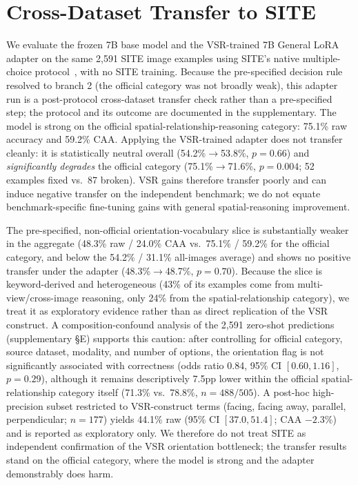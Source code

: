 \section{Cross-Dataset Transfer to SITE}
\label{sec:site}
We evaluate the frozen 7B base model and the VSR-trained 7B General LoRA adapter on the same 2,591 SITE image examples using SITE's native multiple-choice protocol~\cite{wang2025site}, with no SITE training. Because the pre-specified decision rule resolved to branch 2 (the official category was not broadly weak), this adapter run is a post-protocol cross-dataset transfer check rather than a pre-specified step; the protocol and its outcome are documented in the supplementary. The model is strong on the official spatial-relationship-reasoning category: 75.1\% raw accuracy and 59.2\% CAA. Applying the VSR-trained adapter does not transfer cleanly: it is statistically neutral overall (54.2\%$\rightarrow$53.8\%, $p=0.66$) and \emph{significantly degrades} the official category (75.1\%$\rightarrow$71.6\%, $p=0.004$; 52 examples fixed vs.\ 87 broken). VSR gains therefore transfer poorly and can induce negative transfer on the independent benchmark; we do not equate benchmark-specific fine-tuning gains with general spatial-reasoning improvement.

The pre-specified, non-official orientation-vocabulary slice is substantially weaker in the aggregate (48.3\% raw / 24.0\% CAA vs.\ 75.1\% / 59.2\% for the official category, and below the 54.2\% / 31.1\% all-images average) and shows no positive transfer under the adapter (48.3\%$\rightarrow$48.7\%, $p=0.70$). Because the slice is keyword-derived and heterogeneous (43\% of its examples come from multi-view/cross-image reasoning, only 24\% from the spatial-relationship category), we treat it as exploratory evidence rather than as direct replication of the VSR construct. A composition-confound analysis of the 2,591 zero-shot predictions (supplementary \S E) supports this caution: after controlling for official category, source dataset, modality, and number of options, the orientation flag is not significantly associated with correctness (odds ratio 0.84, 95\% CI $[0.60, 1.16]$, $p=0.29$), although it remains descriptively 7.5pp lower within the official spatial-relationship category itself (71.3\% vs.\ 78.8\%, $n{=}488/505$). A post-hoc high-precision subset restricted to VSR-construct terms (facing, facing away, parallel, perpendicular; $n{=}177$) yields 44.1\% raw (95\% CI $[37.0, 51.4]$; CAA $-2.3\%$) and is reported as exploratory only. We therefore do not treat SITE as independent confirmation of the VSR orientation bottleneck; the transfer results stand on the official category, where the model is strong and the adapter demonstrably does harm.

